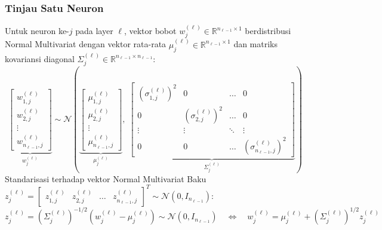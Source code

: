\documentclass[11pt,a4paper]{article}
\def\boldsymbol#1{#1}%
\def\mathbf#1{#1}%
\theoremstyle{plain}
\theoremstyle{definition}
\theoremstyle{remark}
\begin{document}
\subsubsection{Tinjau Satu Neuron}
\label{subsubsec:tinjau_satu_neuron}

\noindent Untuk neuron ke-$j$ pada layer $\ell$, vektor bobot $\mathbf{w}^{(\ell)}_j \in \mathbb{R}^{n_{\ell-1} \times 1}$ berdistribusi Normal Multivariat dengan vektor rata-rata $\boldsymbol{\mu}^{(\ell)}_j \in \mathbb{R}^{n_{\ell-1} \times 1}$ dan matriks kovariansi diagonal $\Sigma^{(\ell)}_j \in \mathbb{R}^{n_{\ell-1} \times n_{\ell-1}}$:
\begin{equation}
    \underbrace{\begin{bmatrix} w^{(\ell)}_{1, j} \\ w^{(\ell)}_{2, j} \\ \vdots \\ w^{(\ell)}_{n_{\ell-1}, j} \end{bmatrix}}_{\mathbf{w}^{(\ell)}_j} \sim \mathcal{N}\!\left(
    \underbrace{\begin{bmatrix} \mu^{(\ell)}_{1, j} \\ \mu^{(\ell)}_{2, j} \\ \vdots \\ \mu^{(\ell)}_{n_{\ell-1}, j} \end{bmatrix}}_{\boldsymbol{\mu}^{(\ell)}_j}, \;
    \underbrace{\begin{bmatrix}
        \left(\sigma^{(\ell)}_{1, j}\right)^2 & 0 & \dots & 0 \\
        0 & \left(\sigma^{(\ell)}_{2, j}\right)^2 & \dots & 0 \\
        \vdots & \vdots & \ddots & \vdots \\
        0 & 0 & \dots & \left(\sigma^{(\ell)}_{n_{\ell-1}, j}\right)^2
    \end{bmatrix}}_{\Sigma^{(\ell)}_j}
    \right) \label{eq:w_mvn}
\end{equation}
Standarisasi terhadap vektor Normal Multivariat Baku $\mathbf{z}^{(\ell)}_j = \begin{bmatrix} z^{(\ell)}_{1, j} & z^{(\ell)}_{2, j} & \dots & z^{(\ell)}_{n_{\ell-1}, j} \end{bmatrix}^T \sim \mathcal{N}\!\left(\mathbf{0}, I_{n_{\ell-1}}\right)$:
\begin{equation}
    \mathbf{z}^{(\ell)}_j = \left(\Sigma^{(\ell)}_j\right)^{-1/2} \left( \mathbf{w}^{(\ell)}_j - \boldsymbol{\mu}^{(\ell)}_j \right) \sim \mathcal{N}\!\left(\mathbf{0}, I_{n_{\ell-1}}\right) \quad \Longleftrightarrow \quad \mathbf{w}^{(\ell)}_j = \boldsymbol{\mu}^{(\ell)}_j + \left(\Sigma^{(\ell)}_j\right)^{1/2} \mathbf{z}^{(\ell)}_j \label{eq:mvn_reparam_vec}
\end{equation}
\end{document}
